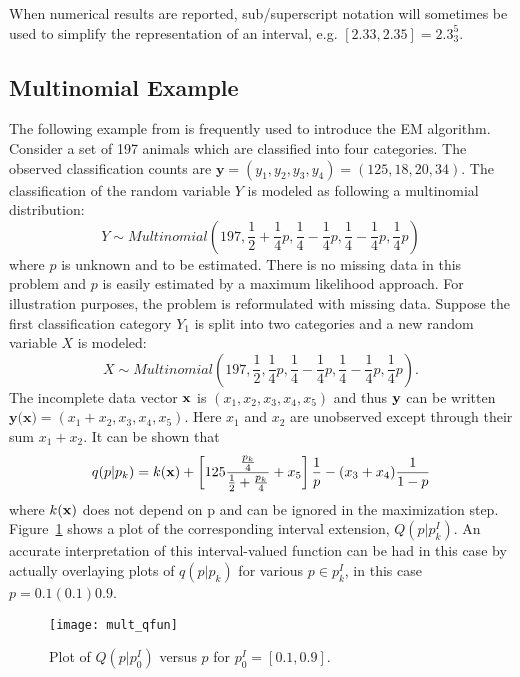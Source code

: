 When numerical results are reported, sub/superscript notation will sometimes
be used to simplify the representation of an interval, e.g. $[2.33,2.35] =
2.3_3^5$.

\subsection{Multinomial Example}
The following example from \cite{DLR} 
is frequently used to introduce the 
EM algorithm.  Consider a set of 197 animals
which are classified into four categories.  The observed classification counts
are $\mathbf{y} = (y_1, y_2, y_3, y_4) = (125, 18, 20, 34) $.  The
classification of the random variable $Y$ is 
modeled as following a multinomial distribution:
$$
Y \sim Multinomial\left(197, \frac{1}{2} + \frac{1}{4} p,    
  \frac{1}{4} - \frac{1}{4} p, 
  \frac{1}{4} - \frac{1}{4} p, \frac{1}{4} p \right)$$ 
where $p$ is unknown and to be estimated.  There is no missing data in this
problem and 
$p$ is easily estimated by a maximum likelihood approach.  For illustration
 purposes, the problem is reformulated with
missing data.  Suppose the first classification category $Y_1$ is split
into two categories and a new random variable $X$ is modeled:
$$
X \sim Multinomial\left(197, \frac{1}{2}, \frac{1}{4}p, 
  \frac{1}{4} - \frac{1}{4} p , 
  \frac{1}{4} - \frac{1}{4} p , \frac{1}{4} p\right).$$
The incomplete data vector ${\bf x}$ is $(x_1, x_2, x_3, x_4, x_5) $ 
and thus ${\bf y}$ can be written
$ \mathbf{y ( }\mathbf{x}) = (x_1 + x_2, x_3, x_4, x_5)$.
Here $x_1$ and $x_2$ are unobserved except through their sum $x_1 + x_2$.
It can be shown that
\begin{equation}
\label{multinomial:q}
q(p | p_k) = k({\bf x}) +
\left[125\frac{\frac{p_k}{4}}{\frac{1}{2}+\frac{p_k}{4}}+x_5
\right]\frac{1}{p} - (x_3 + x_4) \frac{1}{1-p}
\end{equation}
where $k({\bf x})$ does not depend on p and can be ignored in the maximization
step.  Figure~\ref{mult:qfuns} shows a plot of the corresponding interval
extension, $Q(p|p_k^I)$.  An accurate interpretation of this interval-valued
function can be had in this case by actually overlaying plots of $q(p|p_k)$
for various $p \in p_k^I$, in this case $p=0.1(0.1)0.9$.
\begin{figure}[ht]
\begin{center}
\resizebox{11 cm}{10 cm} {\texttt{[image: mult\_qfun]}}
\caption{Plot of $Q(p|p_0^I)$ versus $p$ for 
$p_0^I=[0.1,0.9]$.\label{mult:qfuns}}
\end{center}
\end{figure}

